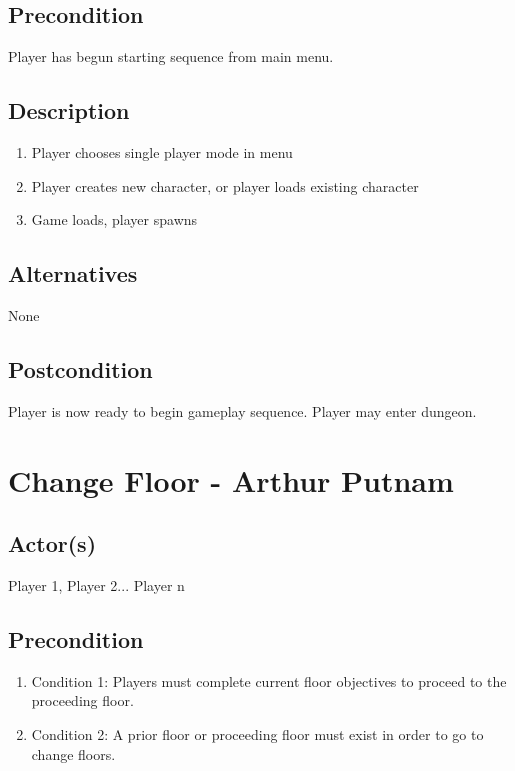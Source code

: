 \documentclass[11pt]{article}
\begin{document}
		\subsection{Precondition}
 			Player has begun starting sequence from main menu.
		\subsection{Description}
			\begin{enumerate}
			\item Player chooses single player mode in menu
			\item Player creates new character, or player loads existing character
			\item Game loads, player spawns
			\end{enumerate}

		\subsection{Alternatives}
			None

		\subsection{Postcondition}
			Player is now ready to begin gameplay sequence. Player may enter dungeon.



    \section{Change Floor - Arthur Putnam}
	

		\subsection{Actor(s)}
		Player 1, Player 2... Player n
			

		\subsection{Precondition}
		\begin{enumerate}
		\item Condition 1: Players must complete current floor objectives to proceed to the proceeding floor.
        \item Condition 2: A prior floor or proceeding floor must exist in order to go to change floors.
		\end{enumerate}
	
\end{document}
